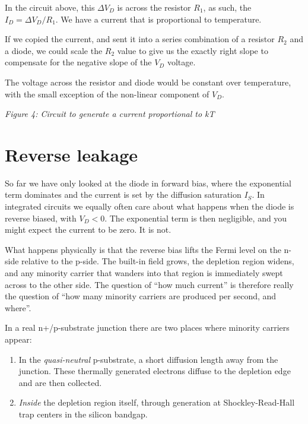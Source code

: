 In the circuit above, this \(\Delta V_D\) is across the resistor
\(R_1\), as such, the \(I_D  = \Delta V_D/R_1\). We have a current that
is proportional to temperature.

If we copied the current, and sent it into a series combination of a
resistor \(R_2\) and a diode, we could scale the \(R_2\) value to give
us the exactly right slope to compensate for the negative slope of the
\(V_D\) voltage.

The voltage across the resistor and diode would be constant over
temperature, with the small exception of the non-linear component of
\(V_D\).


{
\centering
{}
}

\emph{Figure 4: Circuit to generate a current proportional to kT}

\section{Reverse leakage}\label{reverse-leakage}

So far we have only looked at the diode in forward bias, where the
exponential term dominates and the current is set by the diffusion
saturation \(I_S\). In integrated circuits we equally often care about
what happens when the diode is reverse biased, with \(V_D < 0\). The
exponential term is then negligible, and you might expect the current to
be zero. It is not.

What happens physically is that the reverse bias lifts the Fermi level
on the n-side relative to the p-side. The built-in field grows, the
depletion region widens, and any minority carrier that wanders into that
region is immediately swept across to the other side. The question of
``how much current'' is therefore really the question of ``how many
minority carriers are produced per second, and where''.

In a real n+/p-substrate junction there are two places where minority
carriers appear:

\begin{enumerate}
\def\labelenumi{\arabic{enumi}.}
\tightlist
\item
  In the \emph{quasi-neutral} p-substrate, a short diffusion length away
  from the junction. These thermally generated electrons diffuse to the
  depletion edge and are then collected.
\item
  \emph{Inside} the depletion region itself, through generation at
  Shockley-Read-Hall trap centers in the silicon bandgap.
\end{enumerate}

